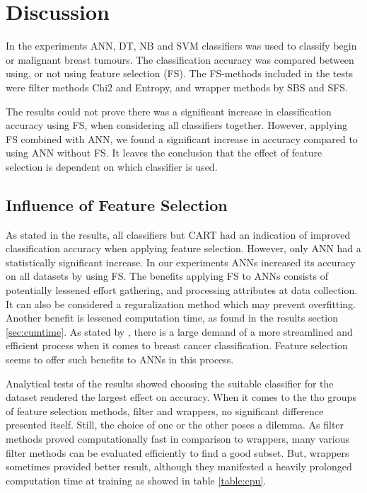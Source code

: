 \chapter{Discussion}

In the experiments ANN, DT, NB and SVM classifiers was used to classify begin or malignant breast tumours. The classification accuracy was compared between using, or not using feature selection (FS). The FS-methods included in the tests were filter methods Chi2 and Entropy, and wrapper methods by SBS and SFS.

The results could not prove there was a significant increase in classification accuracy using FS, when considering all classifiers together. However, applying FS combined with ANN, we found a significant increase in accuracy compared to using ANN without FS. It leaves the conclusion that the effect of feature selection is dependent on which classifier is used.

\section{Influence of Feature Selection}

As stated in the results, all classifiers but CART had an indication of improved classification accuracy when applying feature selection. However, only ANN had a statistically significant increase. In our experiments ANNs increased its accuracy on all datasets by using FS. The benefits applying FS to ANNs consists of potentially lessened effort gathering, and processing attributes at data collection. It can also be considered a reguralization method which may prevent overfitting. Another benefit is lessened computation time, as found in the results section \ref{sec:cumtime}. As stated by \textcite{martei2018}, there is a large demand of a more streamlined and efficient process when it comes to breast cancer classification. Feature selection seems to offer such benefits to ANNs in this process.

Analytical tests of the results showed choosing the suitable classifier for the dataset rendered the largest effect on accuracy. When it comes to the tho groups of feature selection methods, filter and wrappers, no significant difference presented itself. Still, the choice of one or the other poses a dilemma. As filter methods proved computationally fast in comparison to wrappers, many various filter methods can be evaluated efficiently to find a good subset. But, wrappers sometimes provided better result, although they manifested a heavily prolonged computation time at training as showed in table \ref{table:cpu}.

